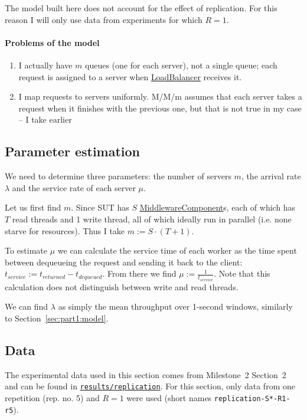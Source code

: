 \documentclass[11pt]{article}
\newcommand{\todo}[1]{\fcolorbox{black}{Apricot}{TODO: #1}}
\newcommand{\linkmain}[1]{\href{https://gitlab.inf.ethz.ch/pungast/asl-fall16-project/blob/master/src/main/java/asl/#1.java}{#1}}
\begin{document}
The model built here does not account for the effect of replication. For this reason I will only use data from experiments for which $R=1$.

\paragraph{Problems of the model}
\todo{}

\begin{enumerate}
	\item I actually have $m$ queues (one for each server), not a single queue; each request is assigned to a server when \linkmain{LoadBalancer} receives it.
	\item I map requests to servers uniformly. M/M/m assumes that each server takes a request when it finishes with the previous one, but that is not true in my case -- I take earlier
\end{enumerate}

\subsection{Parameter estimation}

We need to determine three parameters: the number of servers $m$, the arrival rate $\lambda$ and the service rate of each server $\mu$.

Let us first find $m$. Since SUT has $S$ \linkmain{MiddlewareComponent}s, each of which has $T$ read threads and 1 write thread, all of which ideally run in parallel (i.e. none starve for resources). Thus I take $m := S \cdot (T + 1)$.

To estimate $\mu$ we can calculate the service time of each worker as the time spent between dequeueing the request and sending it back to the client: $t_{service} := t_{returned} - t_{dequeued}$. From there we find $\mu := \frac{1}{t_{service}}$. Note that this calculation does not distinguish between write and read threads.

We can find $\lambda$ as simply the mean throughput over 1-second windows, similarly to Section~\ref{sec:part1:model}.


\subsection{Data}

The experimental data used in this section comes from Milestone~2 Section~2 and can be found in \texttt{\href{https://gitlab.inf.ethz.ch/pungast/asl-fall16-project/tree/master/results/replication}{results/replication}}. For this section, only data from one repetition (rep. no. 5) and $R=1$ were used (short names \texttt{replication-S*-R1-r5}).
\end{document}
